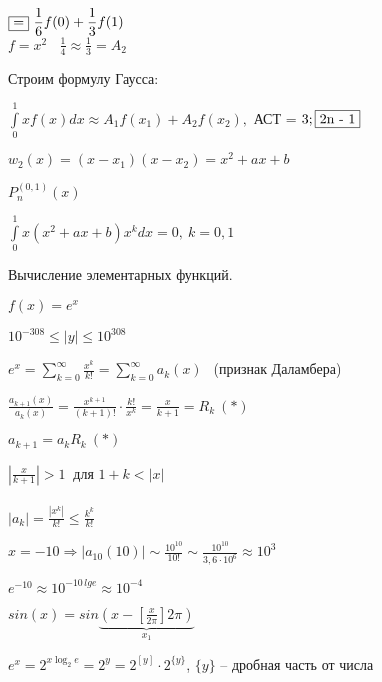 \documentclass[12pt]{article}
\begin{document}
$\fbox{=} \ \displaystyle{\frac{1}{6}}f(0) + \displaystyle{\frac{1}{3}}f(1)$
\\

$f = x^2 \ \ \ \ \displaystyle{\frac{1}{4}} \approx \displaystyle{\frac{1}{3}} = A_2$
\\

{
\setlength{\leftskip}{3em}
Строим формулу Гаусса:

}

$\int\limits_0^1 xf(x)dx \approx A_1f(x_1) + A_2f(x_2), $ АСТ = $3; \fbox{2n - 1}$

$w_2(x) = (x - x_1)(x - x_2) = x^2 + ax + b$

$P_n^{(0, 1)}(x)$

$\int\limits_0^1 x(x^2 + ax + b)x^kdx = 0, \ k = 0, 1$

\centerline{Вычисление элементарных функций.}

$f(x) = e^x$

$10^{-308} \leq |y| \leq 10^{308}$

$e^x = \sum\limits_{k=0}^\infty \frac{x^k}{k!} = \sum\limits_{k=0}^\infty a_k(x) \ \ $ (признак Даламбера)

{
\setlength{\leftskip}{3em}

$\displaystyle{\frac{a_{k+1}(x)}{a_k(x)}} = \displaystyle{\frac{x^{k+1}}{(k+1)!}} \cdot \displaystyle{\frac{k!}{x^k}} = \displaystyle{\frac{x}{k+1}} = R_k \ (*)$

}
\newpage



$a_{k+1} = a_kR_k \ (*)$

$\left| \displaystyle{\frac{x}{k+1}} \right| > 1 \ $ для $1 + k < |x|$
\\

\\

$|a_k| = \displaystyle{\frac{|x^k|}{k!}} \leq \displaystyle{\frac{k^k}{k!}}$

$x = -10 \Rightarrow |a_{10}(10)| \sim \displaystyle{\frac{10^{10}}{10!}} \sim \displaystyle{\frac{10^{10}}{3,6 \cdot 10^6}} \approx 10^3$

$e^{-10} \approx 10^{-10\, lge} \approx 10^{-4}$

\newpage



$sin(x) = sin\underbrace{\left( x-\left[ \frac{x}{2\pi}\right]2\pi \right)}_{x_1}$

$e^x = 2^{x\log_2e} = 2^y = 2^{[y]}\cdot 2^{\{y\}}$, $\{y\}$ -- дробная часть от числа
\end{document}
